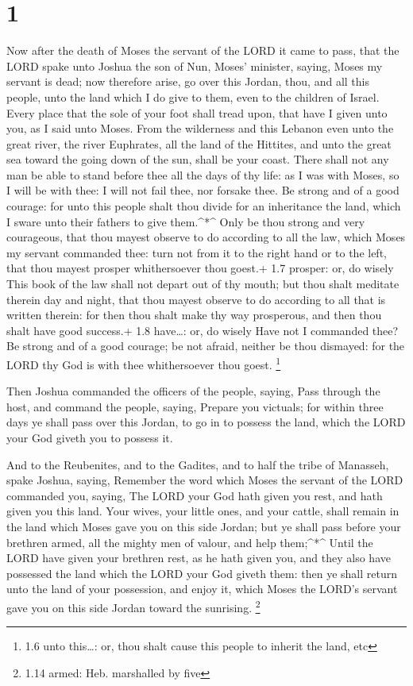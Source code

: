 \hypertarget{section}{%
\section{1}\label{section}}

 Now after the death of Moses the servant of the LORD it
came to pass, that the LORD spake unto Joshua the son of Nun, Moses'
minister, saying,  Moses my servant is dead; now therefore
arise, go over this Jordan, thou, and all this people, unto the land
which I do give to them, even to the children of Israel. 
Every place that the sole of your foot shall tread upon, that have I
given unto you, as I said unto Moses.  From the wilderness
and this Lebanon even unto the great river, the river Euphrates, all the
land of the Hittites, and unto the great sea toward the going down of
the sun, shall be your coast.  There shall not any man be
able to stand before thee all the days of thy life: as I was with Moses,
so I will be with thee: I will not fail thee, nor forsake thee.
 Be strong and of a good courage: for unto this people shalt
thou divide for an inheritance the land, which I sware unto their
fathers to give them.\^{}*\^{}  Only be thou strong and very
courageous, that thou mayest observe to do according to all the law,
which Moses my servant commanded thee: turn not from it to the right
hand or to the left, that thou mayest prosper whithersoever thou goest.+
1.7 prosper: or, do wisely  This book of the law shall not
depart out of thy mouth; but thou shalt meditate therein day and night,
that thou mayest observe to do according to all that is written therein:
for then thou shalt make thy way prosperous, and then thou shalt have
good success.+ 1.8 have\ldots: or, do wisely  Have not I
commanded thee? Be strong and of a good courage; be not afraid, neither
be thou dismayed: for the LORD thy God is with thee whithersoever thou
goest. \footnote{1.6 unto this\ldots: or, thou shalt cause this people
  to inherit the land, etc}

 Then Joshua commanded the officers of the people, saying,
 Pass through the host, and command the people, saying,
Prepare you victuals; for within three days ye shall pass over this
Jordan, to go in to possess the land, which the LORD your God giveth you
to possess it.

 And to the Reubenites, and to the Gadites, and to half the
tribe of Manasseh, spake Joshua, saying,  Remember the word
which Moses the servant of the LORD commanded you, saying, The LORD your
God hath given you rest, and hath given you this land. 
Your wives, your little ones, and your cattle, shall remain in the land
which Moses gave you on this side Jordan; but ye shall pass before your
brethren armed, all the mighty men of valour, and help them;\^{}*\^{}
 Until the LORD have given your brethren rest, as he hath
given you, and they also have possessed the land which the LORD your God
giveth them: then ye shall return unto the land of your possession, and
enjoy it, which Moses the LORD's servant gave you on this side Jordan
toward the sunrising. \footnote{1.14 armed: Heb. marshalled by five}

